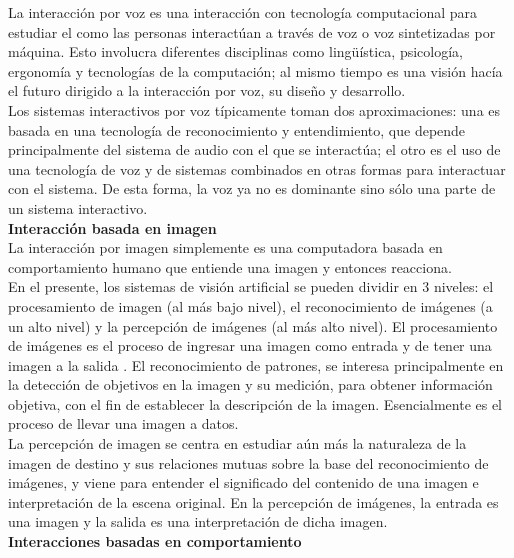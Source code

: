 La interacción por voz es una interacción con tecnología computacional para estudiar el como las personas interactúan a través de voz o voz sintetizadas por máquina. Esto involucra diferentes disciplinas como lingüística, psicología, ergonomía y tecnologías de la computación; al mismo tiempo es una visión hacía el futuro dirigido a la interacción por voz, su diseño y desarrollo. \\

Los sistemas interactivos por voz típicamente toman dos aproximaciones: una es basada en una tecnología de reconocimiento y entendimiento, que depende principalmente del sistema de audio con el que se interactúa; el otro es el uso de una tecnología de voz y de sistemas combinados en otras formas para interactuar con el sistema. De esta forma, la voz ya no es dominante sino sólo una parte de un sistema interactivo. \\

\textbf{Interacción basada en imagen} \\

La interacción por imagen simplemente es una computadora basada en comportamiento humano que entiende una imagen y entonces reacciona. \\

En el presente, los sistemas de visión artificial se pueden dividir en 3 niveles: el procesamiento de imagen (al más bajo nivel), el reconocimiento de imágenes (a un alto nivel) y la percepción de imágenes (al más alto nivel). El procesamiento de imágenes es el proceso de ingresar una imagen como entrada y de tener una imagen a la salida \cite{Weiyuan}. El reconocimiento de patrones, se interesa principalmente en la detección de objetivos en la imagen y su medición, para obtener información objetiva, con el fin de establecer la descripción de la imagen. Esencialmente es el proceso de llevar una imagen a datos. \\

La percepción de imagen se centra en estudiar aún más la naturaleza de la imagen de destino y sus relaciones mutuas sobre la base del reconocimiento de imágenes, y viene para entender el significado del contenido de una imagen e interpretación de la escena original. En la percepción de imágenes, la entrada es una imagen y la salida es una interpretación de dicha imagen. \\

\textbf{Interacciones basadas en comportamiento} \\

